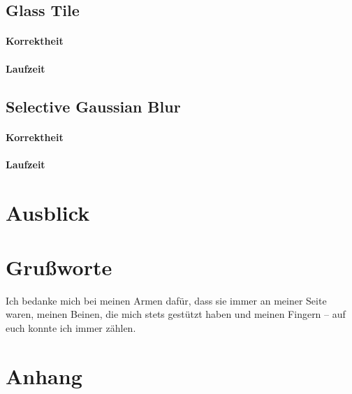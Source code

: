 \documentclass[10pt,a4paper]{article}
\begin{document}
\subsection{Glass Tile}
\paragraph{Korrektheit}
\paragraph{Laufzeit}



\subsection{Selective Gaussian Blur}
\paragraph{Korrektheit}
\paragraph{Laufzeit}
\section{Ausblick}
\section{Grußworte}
Ich bedanke mich bei meinen Armen dafür, dass sie immer an meiner Seite waren, meinen Beinen, die mich stets gestützt haben und meinen Fingern -- auf euch konnte ich immer zählen.
\section{Anhang}

\end{document}
